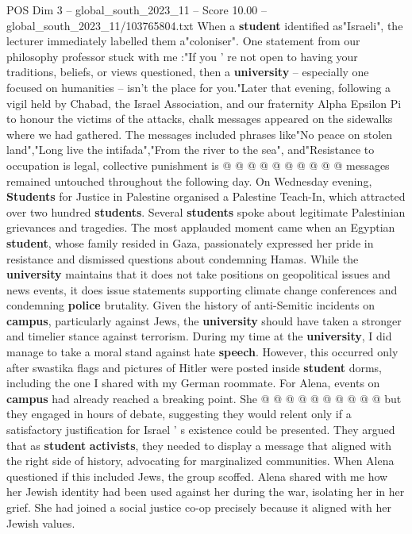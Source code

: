 \begin{textsample}{POS Dim 3 – global\_south\_2023\_11 – Score 10.00 – global\_south\_2023\_11/103765804.txt}
When a \textbf{student} identified as"Israeli", the lecturer immediately labelled them a"coloniser".
One statement from our philosophy professor stuck with me :"If you ' re not open to having your traditions, beliefs, or views questioned, then a \textbf{university} -- especially one focused on humanities -- isn't the place for you."Later that evening, following a vigil held by Chabad, the Israel Association, and our fraternity Alpha Epsilon Pi to honour the victims of the attacks, chalk messages appeared on the sidewalks where we had gathered.
The messages included phrases like"No peace on stolen land","Long live the intifada","From the river to the sea", and"Resistance to occupation is legal, collective punishment is @ @ @ @ @ @ @ @ @ @ messages remained untouched throughout the following day.
On Wednesday evening, \textbf{Students} for Justice in Palestine organised a Palestine Teach-In, which attracted over two hundred \textbf{students}.
Several \textbf{students} spoke about legitimate Palestinian grievances and tragedies.
The most applauded moment came when an Egyptian \textbf{student}, whose family resided in Gaza, passionately expressed her pride in resistance and dismissed questions about condemning Hamas.
While the \textbf{university} maintains that it does not take positions on geopolitical issues and news events, it does issue statements supporting climate change conferences and condemning \textbf{police} brutality.
Given the history of anti-Semitic incidents on \textbf{campus}, particularly against Jews, the \textbf{university} should have taken a stronger and timelier stance against terrorism.
During my time at the \textbf{university}, I did manage to take a moral stand against hate \textbf{speech}.
However, this occurred only after swastika flags and pictures of Hitler were posted inside \textbf{student} dorms, including the one I shared with my German roommate.
For Alena, events on \textbf{campus} had already reached a breaking point.
She @ @ @ @ @ @ @ @ @ @ but they engaged in hours of debate, suggesting they would relent only if a satisfactory justification for Israel ' s existence could be presented.
They argued that as \textbf{student} \textbf{activists}, they needed to display a message that aligned with the right side of history, advocating for marginalized communities.
When Alena questioned if this included Jews, the group scoffed.
Alena shared with me how her Jewish identity had been used against her during the war, isolating her in her grief.
She had joined a social justice co-op precisely because it aligned with her Jewish values.

\end{textsample}
